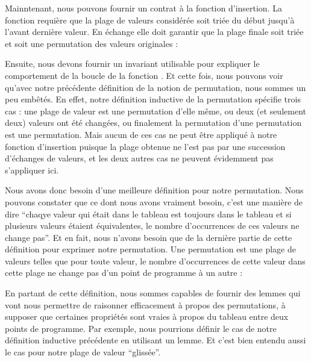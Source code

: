 


Mainntenant, nous pouvons fournir un contrat à la fonction d'insertion. La
fonction requière que la plage de valeurs considérée soit triée du début jusqu'à
l'avant dernière valeur. En échange elle doit garantir que la plage finale soit
triée et soit une permutation des valeurs originales :






Ensuite, nous devons fournir un invariant utilisable pour expliquer le comportement
de la boucle de la fonction . Et cette fois, nous pouvons voir
qu'avec notre précédente définition de la notion de permutation, nous sommes un
peu embêtés. En effet, notre définition inductive de la permutation spécifie trois
cas : une plage de valeur est une permutation d'elle même, ou deux (et seulement
deux) valeurs ont été changées, ou finalement la permutation d'une permutation est
une permutation. Mais aucun de ces cas ne peut être appliqué à notre fonction
d'insertion puisque la plage obtenue ne l'est pas par une succession d'échanges de
valeurs, et les deux autres cas ne peuvent évidemment pas s'appliquer ici.



Nous avons donc besoin d'une meilleure définition pour notre permutation. Nous
pouvons constater que ce dont nous avons vraiment besoin, c'est une manière de
dire ``chaqye valeur qui était dans le tableau est toujours dans le tableau et
si plusieurs valeurs étaient équivalentes, le nombre d'occurrences de ces valeurs
ne change pas''. Et en fait, nous n'avons besoin que de la dernière partie de cette
définition pour exprimer notre permutation. Une permutation est une plage de valeurs
telles que pour toute valeur, le nombre d'occurrences de cette valeur dans cette
plage ne change pas d'un point de programme à un autre :






En partant de cette définition, nous sommes capables de fournir des lemmes qui
vont nous permettre de raisonner efficacement à propos des permutations, à
supposer que certaines propriétés sont vraies à propos du tableau entre deux
points de programme. Par exemple, nous pourrions définir le cas 
de notre définition inductive précédente en utilisant un lemme. Et c'est bien
entendu aussi le cas pour notre plage de valeur ``glissée''.



